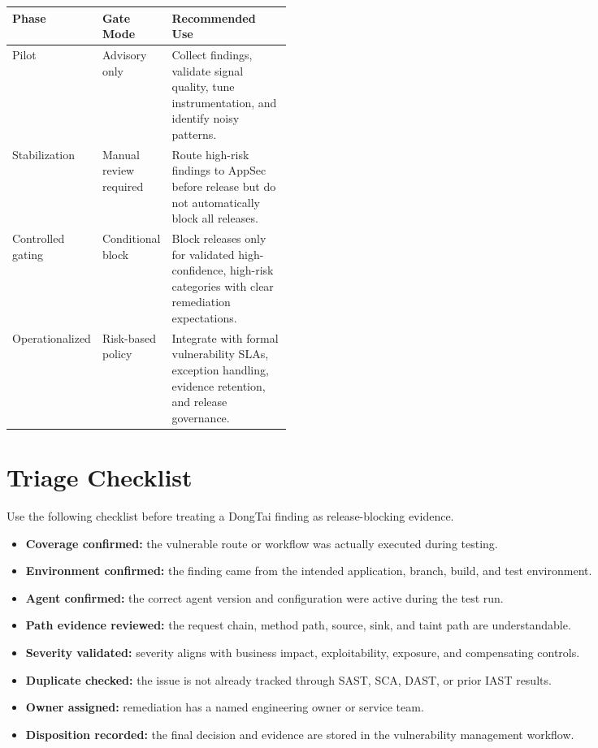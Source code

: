\documentclass[11pt]{article}
\newcommand{\risk}[1]{\textbf{\color{DarkGray}#1}}
\begin{document}
\begin{center}
\begin{tabularx}{\linewidth}{L{0.18\linewidth}L{0.22\linewidth}Y}
\toprule
\textbf{Phase} & \textbf{Gate Mode} & \textbf{Recommended Use} \\
\midrule
Pilot & Advisory only & Collect findings, validate signal quality, tune instrumentation, and identify noisy patterns. \\
Stabilization & Manual review required & Route high-risk findings to AppSec before release but do not automatically block all releases. \\
Controlled gating & Conditional block & Block releases only for validated high-confidence, high-risk categories with clear remediation expectations. \\
Operationalized & Risk-based policy & Integrate with formal vulnerability SLAs, exception handling, evidence retention, and release governance. \\
\bottomrule
\end{tabularx}
\end{center}

\section{Triage Checklist}

Use the following checklist before treating a DongTai finding as release-blocking evidence.

\begin{itemize}
  \item \risk{Coverage confirmed:} the vulnerable route or workflow was actually executed during testing.
  \item \risk{Environment confirmed:} the finding came from the intended application, branch, build, and test environment.
  \item \risk{Agent confirmed:} the correct agent version and configuration were active during the test run.
  \item \risk{Path evidence reviewed:} the request chain, method path, source, sink, and taint path are understandable.
  \item \risk{Severity validated:} severity aligns with business impact, exploitability, exposure, and compensating controls.
  \item \risk{Duplicate checked:} the issue is not already tracked through SAST, SCA, DAST, or prior IAST results.
  \item \risk{Owner assigned:} remediation has a named engineering owner or service team.
  \item \risk{Disposition recorded:} the final decision and evidence are stored in the vulnerability management workflow.
\end{itemize}
\end{document}
